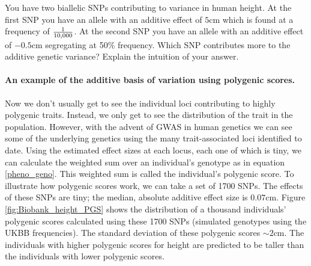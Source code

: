 \begin{question}
You have two biallelic SNPs contributing to variance in human height. At the first SNP you have an allele with an additive effect of $5$cm which is found at a frequency of $\nicefrac{1}{10,000}$. At the second SNP you have an allele with an additive effect of $-0.5$cm segregating at 50\% frequency. Which SNP contributes more to the additive genetic variance? Explain the intuition of your answer.
\end{question}
\paragraph{An example of the additive basis of variation using polygenic scores.}
Now we don't usually get to see the individual loci contributing to
highly polygenic traits. Instead, we only get to see the distribution
of the trait in the population. However, with the advent of GWAS in
human genetics we can see some of the underlying genetics using the
many trait-associated loci identified to date. Using the estimated
effect sizes at each locus, each one of which is tiny, we can
calculate the weighted sum over an individual's genotype as in
equation \ref{pheno_geno}. This weighted sum is called the
individual's polygenic score. To illustrate how polygenic scores work,
we can take a set of 1700 SNPs. The effects of these SNPs are tiny; the median, absolute additive effect size is $0.07$cm. Figure \ref{fig:Biobank_height_PGS} shows the distribution of a thousand individuals' polygenic scores calculated using these 1700 SNPs (simulated genotypes using the UKBB frequencies). The standard deviation of these polygenic scores $\sim 2$cm. 
The individuals with higher polygenic scores for height are predicted to be taller than the individuals with lower polygenic scores. 

